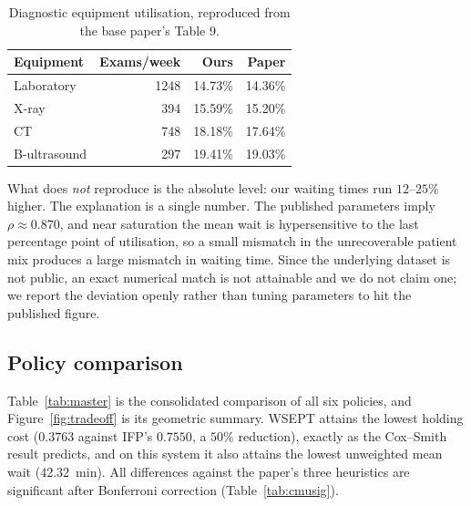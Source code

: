\documentclass[sigconf,nonacm]{acmart}
\begin{document}
\begin{table}[t]
\caption{Diagnostic equipment utilisation, reproduced from the base paper's
         Table 9.}
\label{tab:equip}
\small
\begin{tabular}{@{}lrrr@{}}
\toprule
\textbf{Equipment} & \textbf{Exams/week} & \textbf{Ours} & \textbf{Paper} \\
\midrule
Laboratory   & 1248 & 14.73\% & 14.36\% \\
X-ray        &  394 & 15.59\% & 15.20\% \\
CT           &  748 & 18.18\% & 17.64\% \\
B-ultrasound &  297 & 19.41\% & 19.03\% \\
\bottomrule
\end{tabular}
\end{table}

What does \emph{not} reproduce is the absolute level: our waiting times run
$12$--$25\%$ higher. The explanation is a single number. The published
parameters imply $\rho\approx0.870$, and near saturation the mean wait is
hypersensitive to the last percentage point of utilisation, so a small
mismatch in the unrecoverable patient mix produces a large mismatch in waiting
time. Since the underlying dataset is not public, an exact numerical match is
not attainable and we do not claim one; we report the deviation openly rather
than tuning parameters to hit the published figure.

\subsection{Policy comparison}
Table~\ref{tab:master} is the consolidated comparison of all six policies, and
Figure~\ref{fig:tradeoff} is its geometric summary. WSEPT attains the lowest
holding cost ($0.3763$ against IFP's $0.7550$, a $50\%$ reduction), exactly as
the Cox--Smith result predicts, and on this system it also attains the lowest
unweighted mean wait ($42.32$~min). All differences against the paper's three
heuristics are significant after Bonferroni correction
(Table~\ref{tab:cmusig}).
\end{document}
